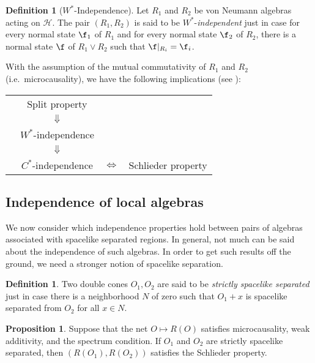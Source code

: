 \documentclass[12pt]{article}
\newenvironment{lilbox}%
  {\bigskip\noindent\begin{Sbox}\begin{minipage}{0.65\textwidth} }%
  {\end{minipage}\end{Sbox}\fbox{\TheSbox}\bigskip}%
\theoremstyle{definition}
\newtheorem{prop}[thm]{Proposition}
\theoremstyle{definition}
\newtheorem{defn}[thm]{Definition}
\theoremstyle{remark}
\def\2#1{{\mathcal #1}}
\begin{document}
\begin{defn}[$W^*$-Independence] Let $R_1$ and $R_2$ be von Neumann
  algebras acting on $\2H$.  The pair $(R_1,R_2)$ is said to be
  $W^*$-\emph{independent} just in case for every normal state $\f _1$
  of $R_1$ and for every normal state $\f _2$ of $R_2$, there is a
  normal state $\f$ of $R_1\vee R_2$ such that $\f |_{R_i}=\f _i$.
\end{defn}

With the assumption of the mutual commutativity of
$R_1$ and $R_2$ (i.e.\ microcausality), we have the
following implications (see \cite[p.\ 222]{sum}):

\begin{lilbox} \begin{tabular}{cccc}
    & Split property \\
    & $\Downarrow$    \\
    &$W^*$-independence \\
    & $\Downarrow $   \\
    & $C^*$-independence & $\Longleftrightarrow$ &
    Schlieder property
\end{tabular} \end{lilbox}



\subsection{Independence of local algebras} \label{lib2}

We now consider which independence properties hold
between pairs of algebras associated with spacelike
separated regions.  In general, not much can be said
about the independence of such algebras.  In order to
get such results off the ground, we need a stronger
notion of spacelike separation.

\begin{defn} Two double cones $O_1,O_2$ are said to be \emph{strictly
    spacelike separated} just in case there is a neighborhood $N$ of
  zero such that $O_1+x$ is spacelike separated from $O_2$ for all
  $x\in N$.  \end{defn}

\begin{prop} Suppose that the net $O\mapsto R(O)$ satisfies
  microcausality, weak additivity, and the spectrum condition.  If
  $O_1$ and $O_2$ are strictly spacelike separated, then
  $(R(O_1),R(O_2))$ satisfies the Schlieder property.
  \label{schlieder} \end{prop}
\end{document}
